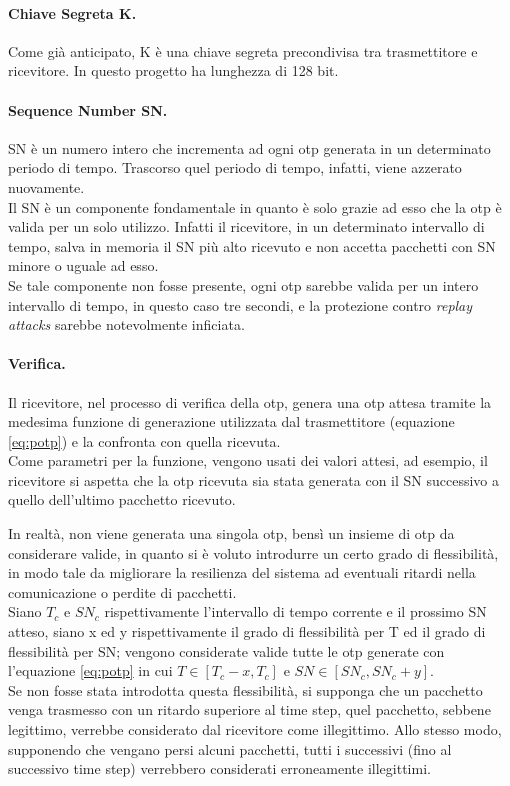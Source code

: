 \paragraph{Chiave Segreta K.}
Come già anticipato, K è una chiave segreta precondivisa tra trasmettitore e ricevitore. In questo progetto ha lunghezza di 128 bit.

\paragraph{Sequence Number SN.}
SN è un numero intero che incrementa ad ogni \gls{otp} generata in un determinato periodo di tempo. Trascorso quel periodo di tempo, infatti, viene azzerato nuovamente.\\
Il SN è un componente fondamentale in quanto è solo grazie ad esso che la \gls{otp} è valida per un solo utilizzo. Infatti il ricevitore, in un determinato intervallo di tempo, salva in memoria il SN più alto ricevuto e non accetta pacchetti con SN minore o uguale ad esso.\\
Se tale componente non fosse presente, ogni \gls{otp} sarebbe valida per un intero intervallo di tempo, in questo caso tre secondi, e la protezione contro \textit{replay attacks} sarebbe notevolmente inficiata.

\paragraph{Verifica.}
Il ricevitore, nel processo di verifica della \gls{otp}, genera una \gls{otp} attesa tramite la medesima funzione di generazione utilizzata dal trasmettitore (equazione \ref{eq:potp}) e la confronta con quella ricevuta.\\
Come parametri per la funzione, vengono usati dei valori attesi, ad esempio, il ricevitore si aspetta che la \gls{otp} ricevuta sia stata generata con il SN successivo a quello dell'ultimo pacchetto ricevuto.

In realtà, non viene generata una singola \gls{otp}, bensì un insieme di \gls{otp} da considerare valide, in quanto si è voluto introdurre un certo grado di flessibilità, in modo tale da migliorare la resilienza del sistema ad eventuali ritardi nella comunicazione o perdite di pacchetti.\\
Siano $T_c$ e $SN_c$ rispettivamente l'intervallo di tempo corrente e il prossimo SN atteso, siano x ed y rispettivamente il grado di flessibilità per T ed il grado di flessibilità per SN; vengono considerate valide tutte le \gls{otp} generate con l'equazione \ref{eq:potp} in cui $T \in [T_c - x, T_c]$ e $SN \in [SN_c, SN_c + y]$.\\
Se non fosse stata introdotta questa flessibilità, si supponga che un pacchetto venga trasmesso con un ritardo superiore al time step, quel pacchetto, sebbene legittimo, verrebbe considerato dal ricevitore come illegittimo. Allo stesso modo, supponendo che vengano persi alcuni pacchetti, tutti i successivi (fino al successivo time step) verrebbero considerati erroneamente illegittimi.



